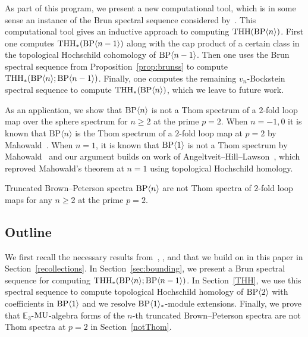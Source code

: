 As part of this program, we present a new computational tool, which is in some sense an instance of the Brun spectral sequence considered by~\cites{Bru00,Hon20}. This computational tool gives an inductive approach to computing $\operatorname{THH}(\mathrm{BP}\langle n\rangle)$. First one computes $\operatorname{THH}_*(\mathrm{BP}\langle n-1\rangle)$ along with the cap product of a certain class in the topological Hochschild cohomology of $\mathrm{BP}\langle n-1\rangle$. Then one uses the Brun spectral sequence from Proposition~\ref{prop:brunss} to compute $\operatorname{THH}_*(\mathrm{BP}\langle n\rangle;\mathrm{BP}\langle n-1\rangle)$.  Finally, one computes the remaining $v_{n}$-Bockstein spectral sequence to compute $\operatorname{THH}_*(\mathrm{BP}\langle n\rangle)$, which we leave to future work. 

As an application, we show that $\mathrm{BP}\langle n\rangle$ is not a Thom spectrum of a $2$-fold loop map over the sphere spectrum for $n\ge 2$ at the prime $p=2$. When $n=-1,0$ it is known that $\mathrm{BP}\langle n\rangle$ is the Thom spectrum of a $2$-fold loop map at $p=2$ by Mahowald~\cite{Mah79}. When $n=1$, it is known that $\mathrm{BP}\langle 1\rangle$ is not a Thom spectrum by Mahowald~\cite{Mah87} and our argument builds on work of Angeltveit--Hill--Lawson~\cite{AHL09}, which reproved Mahowald's theorem at $n=1$ using topological Hochschild homology. 
\begin{thmx}\label{thm:main-thom}
Truncated Brown--Peterson spectra $\mathrm{BP}\langle n\rangle$ are not Thom spectra of $2$-fold loop maps for any $n\ge 2$ at the prime $p=2$. 
\end{thmx}

\subsection{Outline}
We first recall the necessary results from~\cite{AHL10}, \cite{AR05}, and \cite{ACH24} that we build on in this paper in Section~\ref{recollections}. In Section~\ref{sec:bounding}, we present a Brun spectral sequence for computing $\mathrm{THH}_*(\mathrm{BP}\langle n\rangle ;\mathrm{BP}\langle n-1\rangle)$. In Section~\ref{THH}, we use this spectral sequence to compute topological Hochschild homology of $\mathrm{BP}\langle 2\rangle$ with coefficients in $\mathrm{BP}\langle 1\rangle$ and we resolve  $\mathrm{BP}\langle 1\rangle_*$-module extensions. Finally, we prove that $\mathbb{E}_3$-$\mathrm{MU}$-algebra forms of the $n$-th truncated Brown--Peterson spectra are not Thom spectra at $p=2$ in Section~\ref{notThom}. 

